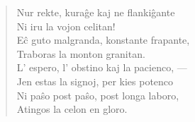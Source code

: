 \begin{verse}
                  \vin  Nur rekte, kura\^ge kaj ne flanki\^gante\\
                Ni iru la vojon celitan!\\
                E\^c guto malgranda, konstante frapante,\\
                Traboras la monton granitan.\\
                L' espero, l' obstino kaj la pacienco, ---\\
                Jen estas la signoj, per kies potenco\\
                Ni pa\^so post pa\^so, post longa laboro,\\
                Atingos la celon en gloro.

\end{verse}


\smallrule{}
